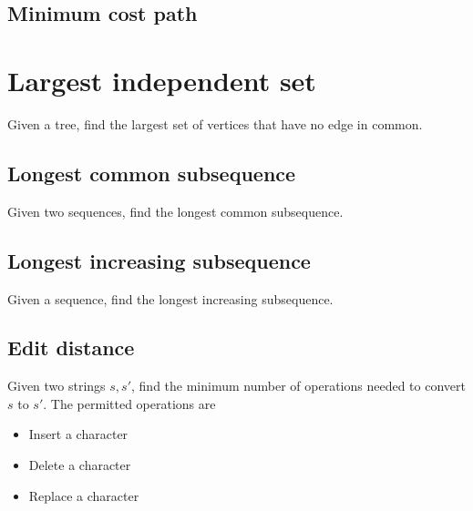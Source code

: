 \subsection*{Minimum cost path}
\section*{Largest independent set}
Given a tree, find the largest set of vertices that have no edge in common.
\subsection*{Longest common subsequence}
Given two sequences, find the longest common subsequence.
\subsection*{Longest increasing subsequence}
Given a sequence, find the longest increasing subsequence.
\subsection*{Edit distance}
Given two strings \(s,s'\), find the minimum number of operations needed to convert \(s\) to \(s'\). The permitted operations are 
\begin{itemize}
    \item Insert a character
    \item Delete a character
    \item Replace a character
\end{itemize}